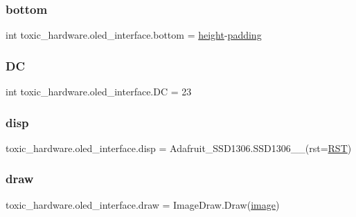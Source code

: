 \subsubsection{\texorpdfstring{bottom}{bottom}}
{\footnotesize\ttfamily int toxic\+\_\+hardware.\+oled\+\_\+interface.\+bottom = \mbox{\hyperlink{namespacetoxic__hardware_1_1oled__interface_a04ce862db440b383129c968ecb0651c6}{height}}-\/\mbox{\hyperlink{namespacetoxic__hardware_1_1oled__interface_a551f91b346cdc03bdfdb32a7a71da5d4}{padding}}}

\mbox{\label{namespacetoxic__hardware_1_1oled__interface_adf756c0d3f22b55d2448ba7589ef6f60}} 
\subsubsection{\texorpdfstring{DC}{DC}}
{\footnotesize\ttfamily int toxic\+\_\+hardware.\+oled\+\_\+interface.\+DC = 23}

\mbox{\label{namespacetoxic__hardware_1_1oled__interface_a79f95b96493be8450d34d9d1d12b6398}} 
\subsubsection{\texorpdfstring{disp}{disp}}
{\footnotesize\ttfamily toxic\+\_\+hardware.\+oled\+\_\+interface.\+disp = Adafruit\+\_\+\+S\+S\+D1306.\+S\+S\+D1306\+\_\+\_(rst=\mbox{\hyperlink{namespacetoxic__hardware_1_1oled__interface_a863726b0bb3ebab40dfafb7dd98fd967}{R\+ST}})}

\mbox{\label{namespacetoxic__hardware_1_1oled__interface_a6b3585c5a31faea000d6630399894c0c}} 
\subsubsection{\texorpdfstring{draw}{draw}}
{\footnotesize\ttfamily toxic\+\_\+hardware.\+oled\+\_\+interface.\+draw = Image\+Draw.\+Draw(\mbox{\hyperlink{namespacetoxic__hardware_1_1oled__interface_adaad3157e9032049ecca2c4ee24cfdb8}{image}})}

